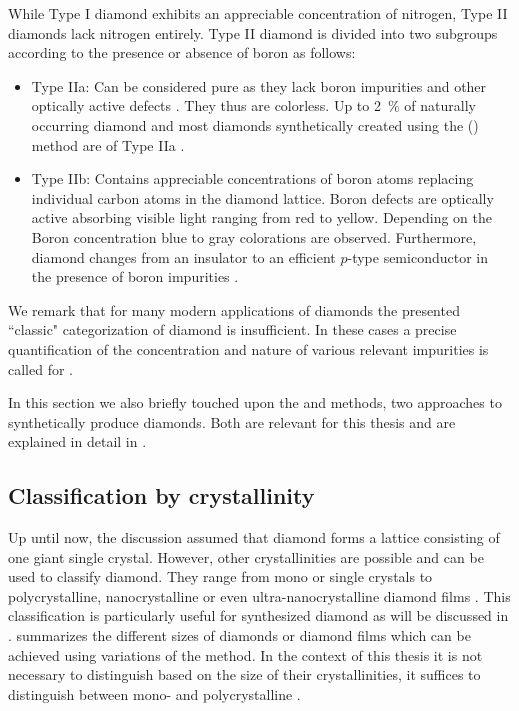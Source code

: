     While Type I diamond exhibits an appreciable concentration of nitrogen, Type II diamonds lack nitrogen entirely. Type II diamond is divided into two subgroups according to the presence or absence of boron as follows:

    \begin{itemize}
      \item Type IIa: Can be considered pure as they lack boron impurities and other optically active defects \cite{Walker1979}. They thus are colorless. Up to \SI{2}{\percent} of naturally occurring diamond and most diamonds synthetically created using the \cvd (\CVD) method are of Type IIa \cite{Zaitsev2001}.
      \item Type IIb: Contains appreciable concentrations of boron atoms replacing individual carbon atoms in the diamond lattice. Boron defects are optically active absorbing visible light ranging from red to yellow. Depending on the Boron concentration blue to gray colorations are observed. Furthermore, diamond changes from an insulator to an efficient $p$-type semiconductor in the presence of boron impurities \cite{Massarani1978}.
    \end{itemize}

    We remark that for many modern applications of diamonds the presented ``classic" categorization of diamond is insufficient. In these cases a precise quantification of the concentration and nature of various relevant impurities is called for \cite{Markham2011, Balasubramanian2009}.

    In this section we also briefly touched upon the \CVD and \HPHT methods, two approaches to synthetically produce diamonds. Both are relevant for this thesis and are explained in detail in .

  \subsection{Classification by crystallinity}

    Up until now, the discussion assumed that diamond forms a lattice consisting of one giant single crystal. However, other crystallinities are possible and can be used to classify diamond.
    They range from mono or single crystals to polycrystalline, nanocrystalline or even ultra-nanocrystalline diamond films \cite{May2000}. This classification is particularly useful for synthesized diamond as will be discussed in .  summarizes the different sizes of diamonds or diamond films which can be achieved using variations of the \CVD method. In the context of this thesis it is not necessary to distinguish \nds based on the size of their crystallinities, it suffices to distinguish between mono- and polycrystalline \nds. 

